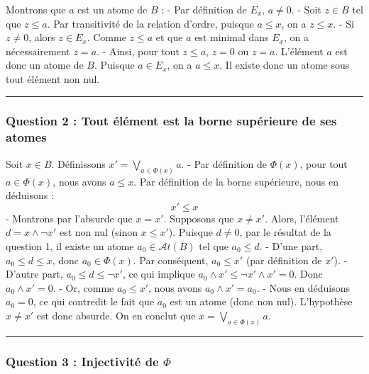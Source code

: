 \documentclass[11pt,a4paper]{article}
\begin{document}
Montrons que \(a\) est un atome de \(B\) : - Par définition de \(E_x\),
\(a \neq 0\). - Soit \(z \in B\) tel que \(z \le a\). Par transitivité
de la relation d'ordre, puisque \(a \le x\), on a \(z \le x\). - Si
\(z \neq 0\), alors \(z \in E_x\). Comme \(z \le a\) et que \(a\) est
minimal dans \(E_x\), on a nécessairement \(z = a\). - Ainsi, pour tout
\(z \le a\), \(z = 0\) ou \(z = a\). L'élément \(a\) est donc un atome
de \(B\). Puisque \(a \in E_x\), on a \(a \le x\). Il existe donc un
atome sous tout élément non nul.

\begin{center}\rule{0.5\linewidth}{0.5pt}\end{center}

\hypertarget{question-2-tout-uxe9luxe9ment-est-la-borne-supuxe9rieure-de-ses-atomes}{%
\subsubsection{Question 2 : Tout élément est la borne supérieure de ses
atomes}\label{question-2-tout-uxe9luxe9ment-est-la-borne-supuxe9rieure-de-ses-atomes}}

Soit \(x \in B\). Définissons \(x' = \bigvee_{a \in \Phi(x)} a\). - Par
définition de \(\Phi(x)\), pour tout \(a \in \Phi(x)\), nous avons
\(a \le x\). Par définition de la borne supérieure, nous en déduisons :
\[x' \le x\] - Montrons par l'absurde que \(x = x'\). Supposons que
\(x \neq x'\). Alors, l'élément \(d = x \land \neg x'\) est non nul
(sinon \(x \le x'\)). Puisque \(d \neq 0\), par le résultat de la
question 1, il existe un atome \(a_0 \in \mathcal{A}t(B)\) tel que
\(a_0 \le d\). - D'une part, \(a_0 \le d \le x\), donc
\(a_0 \in \Phi(x)\). Par conséquent, \(a_0 \le x'\) (par définition de
\(x'\)). - D'autre part, \(a_0 \le d \le \neg x'\), ce qui implique
\(a_0 \land x' \le \neg x' \land x' = 0\). Donc \(a_0 \land x' = 0\). -
Or, comme \(a_0 \le x'\), nous avons \(a_0 \land x' = a_0\). - Nous en
déduisons \(a_0 = 0\), ce qui contredit le fait que \(a_0\) est un atome
(donc non nul). L'hypothèse \(x \neq x'\) est donc absurde. On en
conclut que \(x = \bigvee_{a \in \Phi(x)} a\).

\begin{center}\rule{0.5\linewidth}{0.5pt}\end{center}

\hypertarget{question-3-injectivituxe9-de-phi}{%
\subsubsection{\texorpdfstring{Question 3 : Injectivité de
\(\Phi\)}{Question 3 : Injectivité de \textbackslash Phi}}\label{question-3-injectivituxe9-de-phi}}
\end{document}
